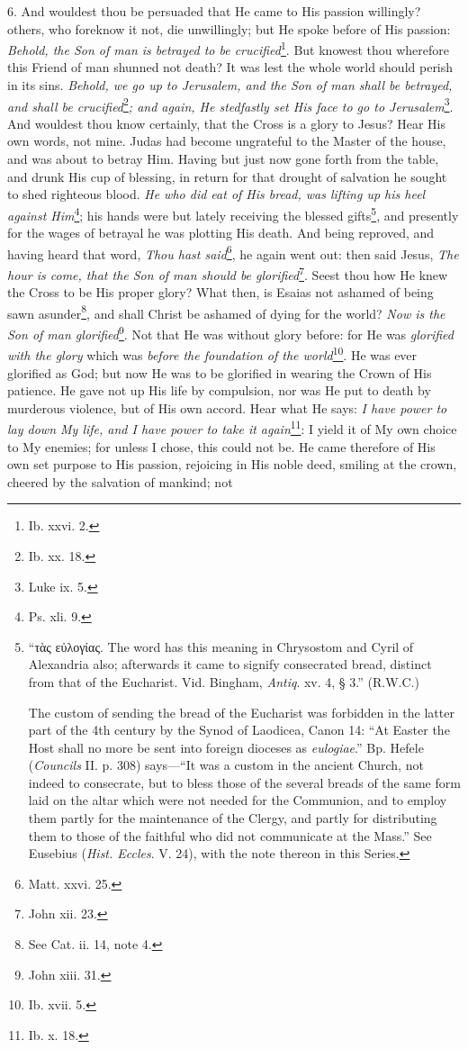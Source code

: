 6. And wouldest thou be persuaded that He came to His passion willingly? others, who foreknow it not, die unwillingly; but He spoke before of His passion: \emph{Behold, the Son of man is betrayed to be crucified}\footnote{Ib. xxvi. 2.}. But knowest thou wherefore this Friend of man shunned not death? It was lest the whole world should perish in its sins. \emph{Behold, we go up to Jerusalem, and the Son of man shall be betrayed, and shall be crucified}\footnote{Ib. xx. 18.}\emph{; and again, He stedfastly set His face to go to Jerusalem}\footnote{Luke ix. 5.}. And wouldest thou know certainly, that the Cross is a glory to Jesus? Hear His own words, not mine. Judas had become ungrateful to the Master of the house, and was about to betray Him. Having but just now gone forth from the table, and drunk His cup of blessing, in return for that drought of salvation he sought to shed righteous blood. \emph{He who did eat of His bread, was lifting up his heel against Him}\footnote{Ps. xli. 9.}; his hands were but lately receiving the blessed gifts\footnote{“\textgreek{τὰς εὐλογίας}. The word has this meaning in Chrysostom and Cyril of Alexandria also; afterwards it came to signify consecrated bread, distinct from that of the Eucharist. Vid. Bingham, \emph{Antiq}. xv. 4, § 3.” (\textsc{R.W.C.}) \par The custom of sending the bread of the Eucharist was forbidden in the latter part of the 4th century by the Synod of Laodicea, Canon 14: “At Easter the Host shall no more be sent into foreign dioceses as \emph{eulogiae}.” Bp. Hefele (\emph{Councils} II. p. 308) says—“It was a custom in the ancient Church, not indeed to consecrate, but to bless those of the several breads of the same form laid on the altar which were not needed for the Communion, and to employ them partly for the maintenance of the Clergy, and partly for distributing them to those of the faithful who did not communicate at the Mass.” See Eusebius (\emph{Hist. Eccles}. V. 24), with the note thereon in this Series.}, and presently for the wages of betrayal he was plotting His death. And being reproved, and having heard that word, \emph{Thou hast said}\footnote{Matt. xxvi. 25.}, he again went out: then said Jesus, \emph{The hour is come, that the Son of man should be glorified}\footnote{John xii. 23.}. Seest thou how He knew the Cross to be His proper glory? What then, is Esaias not ashamed of being sawn asunder\footnote{See Cat. ii. 14, note 4.}, and shall Christ be ashamed of dying for the world? \emph{Now is the Son of man glorified}\footnote{John xiii. 31.}. Not that He was without glory before: for He was \emph{glorified with the glory} which was \emph{before the foundation of the world}\footnote{Ib. xvii. 5.}. He was ever glorified as God; but now He was to be glorified in wearing the Crown of His patience. He gave not up His life by compulsion, nor was He put to death by murderous violence, but of His own accord. Hear what He says: \emph{I have power to lay down My life, and I have power to take it again}\footnote{Ib. x. 18.}: I yield it of My own choice to My enemies; for unless I chose, this could not be. He came therefore of His own set purpose to His passion, rejoicing in His noble deed, smiling at the crown, cheered by the salvation of mankind; not 